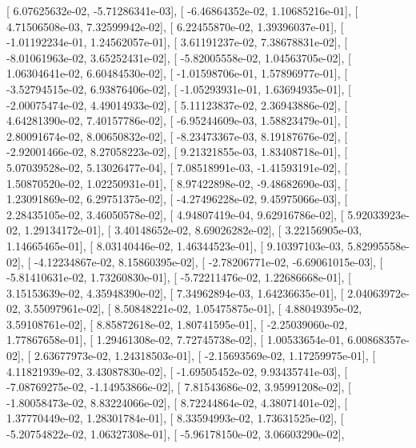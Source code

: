 \documentclass{article}
\begin{document}
       [  6.07625632e-02,  -5.71286341e-03],
       [ -6.46864352e-02,   1.10685216e-01],
       [  4.71506508e-03,   7.32599942e-02],
       [  6.22455870e-02,   1.39396037e-01],
       [ -1.01192234e-01,   1.24562057e-01],
       [  3.61191237e-02,   7.38678831e-02],
       [ -8.01061963e-02,   3.65252431e-02],
       [ -5.82005558e-02,   1.04563705e-02],
       [  1.06304641e-02,   6.60484530e-02],
       [ -1.01598706e-01,   1.57896977e-01],
       [ -3.52794515e-02,   6.93876406e-02],
       [ -1.05293931e-01,   1.63694935e-01],
       [ -2.00075474e-02,   4.49014933e-02],
       [  5.11123837e-02,   2.36943886e-02],
       [  4.64281390e-02,   7.40157786e-02],
       [ -6.95244609e-03,   1.58823479e-01],
       [  2.80091674e-02,   8.00650832e-02],
       [ -8.23473367e-03,   8.19187676e-02],
       [ -2.92001466e-02,   8.27058223e-02],
       [  9.21321855e-03,   1.83408718e-01],
       [  5.07039528e-02,   5.13026477e-04],
       [  7.08518991e-03,  -1.41593191e-02],
       [  1.50870520e-02,   1.02250931e-01],
       [  8.97422898e-02,  -9.48682690e-03],
       [  1.23091869e-02,   6.29751375e-02],
       [ -4.27496228e-02,   9.45975066e-03],
       [  2.28435105e-02,   3.46050578e-02],
       [  4.94807419e-04,   9.62916786e-02],
       [  5.92033923e-02,   1.29134172e-01],
       [  3.40148652e-02,   8.69026282e-02],
       [  3.22156905e-03,   1.14665465e-01],
       [  8.03140446e-02,   1.46344523e-01],
       [  9.10397103e-03,   5.82995558e-02],
       [ -4.12234867e-02,   8.15860395e-02],
       [ -2.78206771e-02,  -6.69061015e-03],
       [ -5.81410631e-02,   1.73260830e-01],
       [ -5.72211476e-02,   1.22686668e-01],
       [  3.15153639e-02,   4.35948390e-02],
       [  7.34962894e-03,   1.64236635e-01],
       [  2.04063972e-02,   3.55097961e-02],
       [  8.50848221e-02,   1.05475875e-01],
       [  4.88049395e-02,   3.59108761e-02],
       [  8.85872618e-02,   1.80741595e-01],
       [ -2.25039060e-02,   1.77867658e-01],
       [  1.29461308e-02,   7.72745738e-02],
       [  1.00533654e-01,   6.00868357e-02],
       [  2.63677973e-02,   1.24318503e-01],
       [ -2.15693569e-02,   1.17259975e-01],
       [  4.11821939e-02,   3.43087830e-02],
       [ -1.69505452e-02,   9.93435741e-03],
       [ -7.08769275e-02,  -1.14953866e-02],
       [  7.81543686e-02,   3.95991208e-02],
       [ -1.80058473e-02,   8.83224066e-02],
       [  8.72244864e-02,   4.38071401e-02],
       [  1.37770449e-02,   1.28301784e-01],
       [  8.33594993e-02,   1.73631525e-02],
       [ -5.20754822e-02,   1.06327308e-01],
       [ -5.96178150e-02,   3.06603290e-02],
\end{document}
